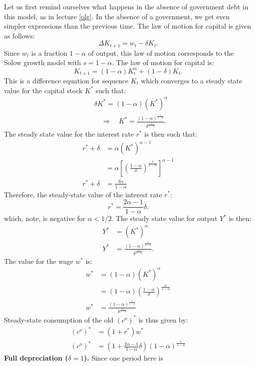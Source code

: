 \documentclass[]{book}
\theoremstyle{definition}
\theoremstyle{definition}
\theoremstyle{definition}
\theoremstyle{remark}
\begin{document}
Let us first remind ourselves what happens in the absence of government
debt in this model, as in lecture \ref{olg}. In the absence of a
government, we get even simpler expressions than the previous time. The
law of motion for capital is given as follows:
\[\Delta K_{t+1}=w_{t}-\delta K_{t}.\] Since \(w_t\) is a fraction
\(1-\alpha\) of output, this law of motion corresponds to the Solow
growth model with \(s = 1-\alpha\). The law of motion for capital is:
\[K_{t+1}=(1-\alpha) K_{t}^{\alpha}+ (1-\delta)K_t.\] This is a
difference equation for sequence \(K_{t}\) which converges to a steady
state value for the capital stock \(K^{*}\) such that: \[
\begin{aligned}
& \delta K^{*} = (1-\alpha)(K^*)^{\alpha}\\
& \quad \Rightarrow \quad K^{*}=\frac{(1-\alpha)^{\frac{1}{1-\alpha}}}{\delta^{\frac{1}{1-\alpha}}}.
\end{aligned}
\] The steady state value for the interest rate \(r^{*}\) is then such
that: \[
\begin{aligned}
r^{*}+\delta&=\alpha(K^{*})^{\alpha-1}\\
&= \alpha \left[\left(\frac{1-\alpha}{\delta}\right)^{\frac{1}{1-\alpha}}\right]^{\alpha-1}\\
r^{*}+\delta &=\frac{\delta \alpha}{1-\alpha}
\end{aligned}
\] Therefore, the steady-state value of the interest rate \(r^{*}\):
\[r^{*} = \frac{2\alpha-1}{1-\alpha}\delta.\] which, note, is negative
for \(\alpha < 1/2\). The steady state value for output \(Y^{*}\) is
then: \[
\begin{aligned}
Y^{*}&=\left(K^{*}\right)^{\alpha}\\
Y^{*}&=\frac{(1-\alpha)^{\frac{\alpha}{1-\alpha}}}{\delta^{\frac{\alpha}{1-\alpha}}}.
\end{aligned}
\] The value for the wage \(w^{*}\) is: \[
\begin{aligned}
w^{*}&=(1-\alpha)\left(K^{*}\right)^{\alpha}\\
&=(1-\alpha) \left(\frac{1-\alpha}{\delta}\right)^{\frac{\alpha}{1-\alpha}}\\
w^{*} &= \frac{\left(1-\alpha\right)^{\frac{1}{1-\alpha}}}{\delta^{\frac{\alpha}{1-\alpha}}}
\end{aligned}
\] Steady-state consumption of the old \((c^{o})^{*}\) is thus given by:
\[
\begin{aligned}
(c^{o})^{*}&=(1+r^*)w^{*}\\
(c^{o})^{*}&=\left(1+ \frac{2\alpha-1}{1-\alpha}\delta\right)\left(1-\alpha\right)^{\frac{1}{1-\alpha}}
\end{aligned}
\] \textbf{Full depreciation (\(\delta = 1\)).} Since one period here is
\end{document}
